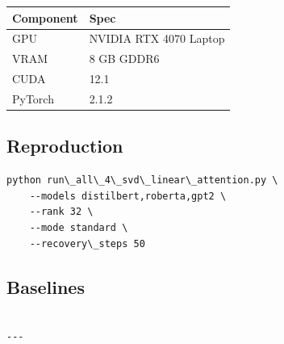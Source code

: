 \begin{table}[H]
\centering
\small
\begin{tabular}{ll}
\toprule
\textbf{Component} & \textbf{Spec} \\
\midrule
GPU & NVIDIA RTX 4070 Laptop \\
VRAM & 8 GB GDDR6 \\
CUDA & 12.1 \\
PyTorch & 2.1.2 \\
\bottomrule
\end{tabular}
\end{table}

\subsection{Reproduction}

\begin{lstlisting}
python run\_all\_4\_svd\_linear\_attention.py \
    --models distilbert,roberta,gpt2 \
    --rank 32 \
    --mode standard \
    --recovery\_steps 50
\end{lstlisting}

\subsection{Baselines}

\begin{lstlisting}

---
\end{lstlisting}